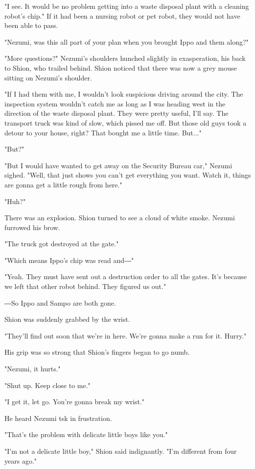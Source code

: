 "I see. It would be no problem getting into a waste disposal plant with
a cleaning robot's chip." If it had been a nursing robot or pet robot,
they would not have been able to pass.

"Nezumi, was this all part of your plan when you brought Ippo and them
along?"

"More questions?" Nezumi's shoulders hunched slightly in exasperation,
his back to Shion, who trailed behind. Shion noticed that there was now
a grey mouse sitting on Nezumi's shoulder.

"If I had them with me, I wouldn't look suspicious driving around the
city. The inspection system wouldn't catch me as long as I was heading
west in the direction of the waste disposal plant. They were pretty
useful, I'll say. The transport truck was kind of slow, which pissed me
off. But those old guys took a detour to your house, right? That bought
me a little time. But..."

"But?"

"But I would have wanted to get away on the Security Bureau car," Nezumi
sighed. "Well, that just shows you can't get everything you want. Watch
it, things are gonna get a little rough from here."

"Huh?"

There was an explosion. Shion turned to see a cloud of white smoke.
Nezumi furrowed his brow.

"The truck got destroyed at the gate."

"Which means Ippo's chip was read and―"

"Yeah. They must have sent out a destruction order to all the gates.
It's because we left that other robot behind. They figured us out."

―So Ippo and Sampo are both gone.

Shion was suddenly grabbed by the wrist.

"They'll find out soon that we're in here. We're gonna make a run for
it. Hurry."

His grip was so strong that Shion's fingers began to go numb.

"Nezumi, it hurts."

"Shut up. Keep close to me."

"I get it, let go. You're gonna break my wrist."

He heard Nezumi tsk in frustration.

"That's the problem with delicate little boys like you."

"I'm not a delicate little boy," Shion said indignantly. "I'm different
from four years ago."

